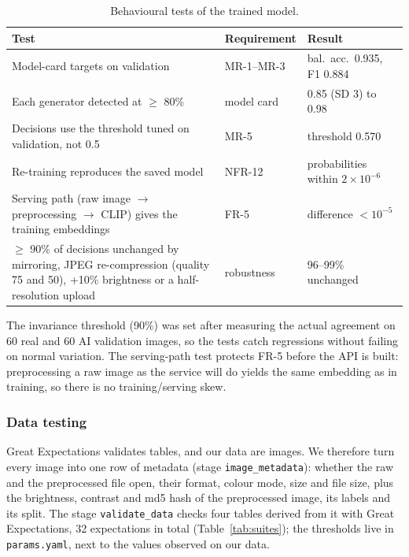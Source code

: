\documentclass[11pt]{article}
\begin{document}
\begin{table}[H]
\centering
\small
\begin{tabularx}{\textwidth}{@{}Y l l@{}}
\toprule
\textbf{Test} & \textbf{Requirement} & \textbf{Result} \\
\midrule
Model-card targets on validation & MR-1--MR-3 & bal.\ acc.\ 0.935, F1 0.884 \\
Each generator detected at $\geq$ 80\% & model card & 0.85 (SD 3) to 0.98 \\
Decisions use the threshold tuned on validation, not 0.5 & MR-5 & threshold 0.570 \\
Re-training reproduces the saved model & NFR-12 & probabilities within $2 \times 10^{-6}$ \\
Serving path (raw image $\rightarrow$ preprocessing $\rightarrow$ CLIP) gives the training embeddings & FR-5 & difference $< 10^{-5}$ \\
$\geq$ 90\% of decisions unchanged by mirroring, JPEG re-compression (quality 75 and 50), +10\% brightness or a half-resolution upload & robustness & 96--99\% unchanged \\
\bottomrule
\end{tabularx}
\caption{Behavioural tests of the trained model.}
\label{tab:model-tests}
\end{table}

The invariance threshold (90\%) was set after measuring the actual agreement on 60 real and 60 AI validation images, so the tests catch regressions without failing on normal variation. The serving-path test protects FR-5 before the API is built: preprocessing a raw image as the service will do yields the same embedding as in training, so there is no training/serving skew.

\subsubsection{Data testing}
\label{sec:data-testing}
Great Expectations validates tables, and our data are images. We therefore turn every image into one row of metadata (stage \texttt{image\_metadata}): whether the raw and the preprocessed file open, their format, colour mode, size and file size, plus the brightness, contrast and md5 hash of the preprocessed image, its labels and its split. The stage \texttt{validate\_data} checks four tables derived from it with Great Expectations, 32 expectations in total (Table~\ref{tab:suites}); the thresholds live in \texttt{params.yaml}, next to the values observed on our data.
\end{document}
